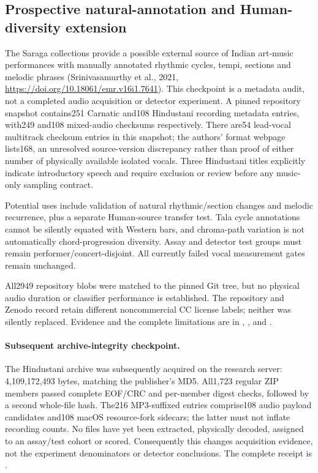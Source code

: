\subsection{Prospective natural-annotation and Human-diversity extension}
The Saraga collections provide a possible external source of Indian art-music
performances with manually annotated rhythmic cycles, tempi, sections and
melodic phrases (Srinivasamurthy et al., 2021,
\url{https://doi.org/10.18061/emr.v16i1.7641}). This checkpoint is a metadata
audit, not a completed audio acquisition or detector experiment. A pinned
repository snapshot contains251 Carnatic and108 Hindustani recording metadata
entries, with249 and108 mixed-audio checksums respectively. There are54
lead-vocal multitrack checksum entries in this snapshot; the authors' format
webpage lists168, an unresolved source-version discrepancy rather than proof
of either number of physically available isolated vocals. Three
Hindustani titles explicitly indicate introductory speech and require exclusion
or review before any music-only sampling contract.

Potential uses include validation of natural rhythmic/section changes and
melodic recurrence, plus a separate Human-source transfer test. Tala cycle
annotations cannot be silently equated with Western bars, and chroma-path
variation is not automatically chord-progression diversity. Assay and detector
test groups must remain performer/concert-disjoint. All currently failed vocal
measurement gates remain unchanged.

All2949 repository blobs were matched to the pinned Git tree, but no physical
audio duration or classifier performance is established. The repository and
Zenodo record retain different noncommercial CC license labels; neither was
silently replaced. Evidence and the complete limitations are in
,
,
and .

\paragraph{Subsequent archive-integrity checkpoint.}
The Hindustani archive was subsequently acquired on the research server:
4,109,172,493 bytes, matching the publisher's MD5. All1,723 regular ZIP members
passed complete EOF/CRC and per-member digest checks, followed by a second
whole-file hash. The216 MP3-suffixed entries comprise108 audio payload candidates
and108 macOS resource-fork sidecars; the latter must not inflate recording
counts. No files have yet been extracted, physically decoded, assigned to an
assay/test cohort or scored. Consequently this changes acquisition evidence,
not the experiment denominators or detector conclusions. The complete receipt
is .


